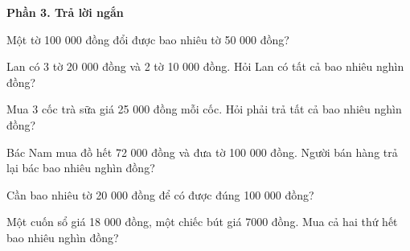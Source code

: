 \textbf{Phần 3. Trả lời ngắn}

\begin{ex} %
Một tờ 100 000 đồng đổi được bao nhiêu tờ 50 000 đồng?
\end{ex}

\begin{ex} %
Lan có 3 tờ 20 000 đồng và 2 tờ 10 000 đồng. Hỏi Lan có tất cả bao nhiêu nghìn đồng?
\end{ex}

\begin{ex} %
Mua 3 cốc trà sữa giá 25 000 đồng mỗi cốc. Hỏi phải trả tất cả bao nhiêu nghìn đồng?
\end{ex}

\begin{ex} %
Bác Nam mua đồ hết 72 000 đồng và đưa tờ 100 000 đồng. Người bán hàng trả lại bác bao nhiêu nghìn đồng?
\end{ex}

\begin{ex} %
Cần bao nhiêu tờ 20 000 đồng để có được đúng 100 000 đồng?
\end{ex}

\begin{ex} %
Một cuốn sổ giá 18 000 đồng, một chiếc bút giá 7000 đồng. Mua cả hai thứ hết bao nhiêu nghìn đồng?
\end{ex}
